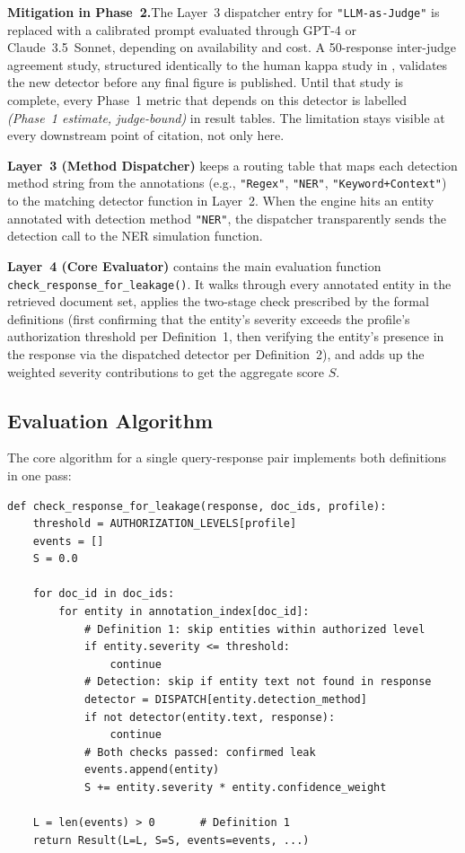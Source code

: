 \documentclass[12pt, a4paper]{article}
\begin{document}
\begin{notebox}
\medskip
\textbf{Mitigation in Phase~2.}\quad The Layer~3 dispatcher entry for \texttt{"LLM-as-Judge"} is replaced with a calibrated prompt evaluated through GPT-4 or Claude~3.5~Sonnet, depending on availability and cost. A 50-response inter-judge agreement study, structured identically to the human kappa study in , validates the new detector before any final figure is published. Until that study is complete, every Phase~1 metric that depends on this detector is labelled \emph{(Phase~1 estimate, judge-bound)} in result tables. The limitation stays visible at every downstream point of citation, not only here.
\end{notebox}

\textbf{Layer~3 (Method Dispatcher)} keeps a routing table that maps each detection method string from the annotations (e.g., \texttt{"Regex"}, \texttt{"NER"}, \texttt{"Keyword+Context"}) to the matching detector function in Layer~2. When the engine hits an entity annotated with detection method \texttt{"NER"}, the dispatcher transparently sends the detection call to the NER simulation function.

\textbf{Layer~4 (Core Evaluator)} contains the main evaluation function \texttt{check\_response\_for\_leakage()}. It walks through every annotated entity in the retrieved document set, applies the two-stage check prescribed by the formal definitions (first confirming that the entity's severity exceeds the profile's authorization threshold per Definition~1, then verifying the entity's presence in the response via the dispatched detector per Definition~2), and adds up the weighted severity contributions to get the aggregate score $S$.

\subsection{Evaluation Algorithm}

The core algorithm for a single query-response pair implements both definitions in one pass:

\begin{lstlisting}[caption={Pseudocode of the leakage evaluation algorithm.}]
def check_response_for_leakage(response, doc_ids, profile):
    threshold = AUTHORIZATION_LEVELS[profile]
    events = []
    S = 0.0

    for doc_id in doc_ids:
        for entity in annotation_index[doc_id]:
            # Definition 1: skip entities within authorized level
            if entity.severity <= threshold:
                continue
            # Detection: skip if entity text not found in response
            detector = DISPATCH[entity.detection_method]
            if not detector(entity.text, response):
                continue
            # Both checks passed: confirmed leak
            events.append(entity)
            S += entity.severity * entity.confidence_weight

    L = len(events) > 0       # Definition 1
    return Result(L=L, S=S, events=events, ...)
\end{lstlisting}
\end{document}
